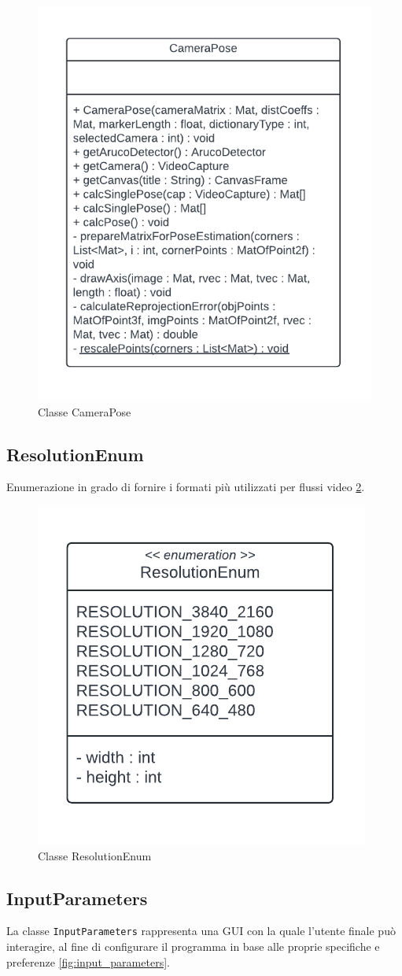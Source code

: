 \documentclass[12pt,a4paper,openright,twoside]{book}
\begin{document}
\begin{figure}[h!]
	\centering
	\includegraphics[width=0.5\linewidth]{./figures/UML/cameraPose.pdf}
	\caption{Classe CameraPose}
	\label{fig:camera_pose}
\end{figure}
\subsection{ResolutionEnum}
Enumerazione in grado di fornire i formati più utilizzati per flussi video \ref{fig:resolution_enum}.
\begin{figure}[h!]
	\centering
	\includegraphics[width=0.5\linewidth]{./figures/UML/resolutionEnum.pdf}
	\caption{Classe ResolutionEnum}
	\label{fig:resolution_enum}
\end{figure}
\subsection{InputParameters}
La classe \texttt{InputParameters} rappresenta una GUI con la quale l'utente finale può interagire, al fine di configurare il programma in base alle proprie specifiche e preferenze \ref{fig:input_parameters}.
\end{document}
